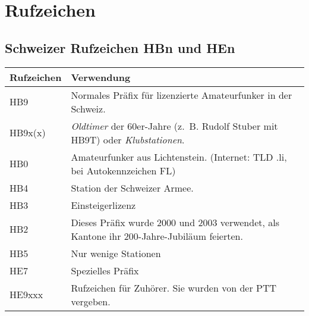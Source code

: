 \chapter{Rufzeichen}

\section{Schweizer Rufzeichen HBn und HEn}
\begin{tabular}{l p{9cm}}
\bfseries Rufzeichen & \bfseries Verwendung \\ \toprule \arrayrulecolor{rowsep}
HB9 & Normales Präfix für lizenzierte Amateurfunker in der Schweiz. \\ \midrule
HB9x(x) & \textit{Oldtimer} der 60er-Jahre (z. B. Rudolf Stuber mit HB9T) oder \textit{Klubstationen}. \\ \midrule
HB0 & Amateurfunker aus Lichtenstein. (Internet: TLD .li, bei Autokennzeichen FL) \\ \midrule
HB4 & Station der Schweizer Armee. \\ \midrule
HB3 & Einsteigerlizenz \\ \midrule
HB2 & Dieses Präfix wurde 2000 und 2003 verwendet, als Kantone ihr 200-Jahre-Jubiläum feierten. \\ \midrule
HB5 & Nur wenige Stationen \\ \midrule
HE7 & Spezielles Präfix \\ \midrule
HE9xxx & Rufzeichen für Zuhörer. Sie wurden von der PTT vergeben. \\ \midrule
\end{tabular}

